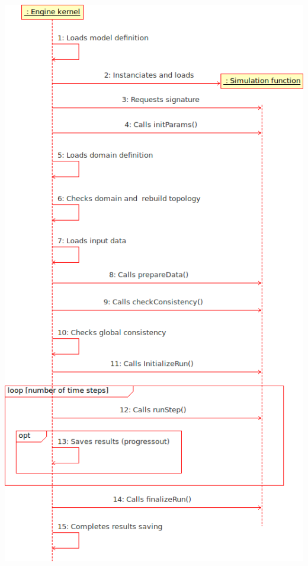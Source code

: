 \begin{htmlonly}
\begin{center}
\includegraphics[scale=1]{common/graphics/ofeseq.png}
\end{center}
\end{htmlonly}

